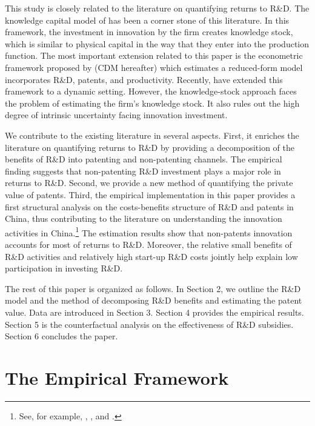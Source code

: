 \documentclass[11pt]{article}
\begin{document}
This study is closely related to the literature on quantifying returns to R\&D. The knowledge capital model of \citet{griliches1979issues} has been a corner stone of this literature. In this framework, the investment in innovation by the firm creates knowledge stock, which is similar to physical capital in the way that they enter into the production function. The most important extension related to this paper is the econometric framework proposed by \citet*{crepon1998research} (CDM hereafter) which estimates a reduced-form model incorporates R\&D, patents, and productivity. Recently, \citet*{raymond2015} have extended this  framework to a dynamic setting. However, the knowledge-stock approach faces the problem of estimating the firm's knowledge stock. It also rules out the high degree of intrinsic  uncertainty facing innovation investment. 

We contribute to the existing literature in several aspects. First, it enriches the literature on quantifying returns to R\&D by providing a decomposition of the benefits of R\&D into patenting and non-patenting channels. The empirical finding suggests that non-patenting R\&D investment plays a major role in returns to R\&D. Second, we provide a new method of quantifying the private value of patents. Third, the empirical implementation in this paper provides a first structural analysis on the costs-benefits structure of R\&D and patents in China, thus contributing to the literature on understanding the innovation activities in China.\footnote{See, for example, \cite{Hu2009}, \cite{Hu2017}, and \cite{chen2017}.} The estimation results show that non-patents innovation accounts for most of returns to R\&D. Moreover, the relative small benefits of R\&D activities and relatively high start-up R\&D costs jointly help explain low participation in investing R\&D. 

The rest of this paper is organized as follows. In Section 2, we outline the R\&D model and the method of decomposing R\&D benefits and estimating the patent value. Data are introduced in Section 3. Section 4 provides the empirical results.  Section 5 is the counterfactual analysis on the effectiveness of R\&D subsidies. Section 6 concludes the paper. 


\section{The Empirical Framework}
\end{document}
